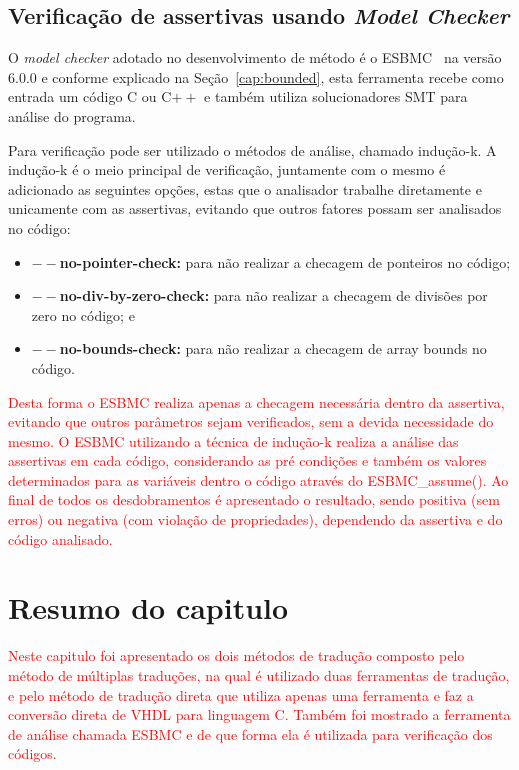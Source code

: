 \subsection{\label{sec:verificacao}Verificação de assertivas usando \textit{Model Checker}}

\par
O \textit{model checker} adotado no desenvolvimento de método é o ESBMC~\cite{cordeiro2012smt} na versão $6.0.0$ e conforme explicado na Seção~\ref{cap:bounded}, esta ferramenta recebe como entrada um código C ou C$++$ e também utiliza solucionadores SMT para análise do programa. 

\par
Para verificação pode ser utilizado o métodos de análise, chamado indução-k. A indução-k é o meio principal de verificação, juntamente com o mesmo é adicionado as seguintes opções, estas que o analisador trabalhe diretamente e unicamente com as assertivas, evitando que outros fatores possam ser analisados no código: 
\begin{itemize} 
    \item \textbf{$--$no-pointer-check:} para não realizar a checagem de ponteiros no código; 
    \item \textbf{$--$no-div-by-zero-check:} para não realizar a checagem de divisões por zero no código; e 
    \item \textbf{$--$no-bounds-check:} para não realizar a checagem de array bounds no código. 
\end{itemize} 

\par
\textcolor{red}{Desta forma o ESBMC realiza apenas a checagem necessária dentro da assertiva, evitando que outros parâmetros sejam verificados, sem a devida necessidade do mesmo. O ESBMC utilizando a técnica de indução-k realiza a análise das assertivas em cada código, considerando as pré condições e também os valores determinados para as variáveis dentro o código através do ESBMC\_assume(). Ao final de todos os desdobramentos é apresentado o resultado, sendo positiva (sem erros) ou negativa (com violação de propriedades), dependendo da assertiva e do código analisado.}

\section{Resumo do capitulo}
\textcolor{red}{Neste capitulo foi apresentado os dois métodos de tradução composto pelo método de múltiplas traduções, na qual é utilizado duas ferramentas de tradução, e pelo método de tradução direta que utiliza apenas uma ferramenta e faz a conversão direta de VHDL para linguagem C. Também foi mostrado a ferramenta de análise chamada ESBMC e de que forma ela é utilizada para verificação dos códigos.} 